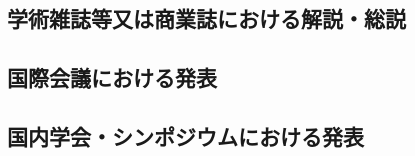 \documentclass[10pt,a4paper,twoside]{jarticle}
\newcommand{\研究課題名}{XMASS検出器を用いた季節変動による暗黒物質の直接探索}
\newcommand{\研究機関名}{神戸大学}
\newcommand{\申請者氏名}{岡直哉}
\newcommand{\研究代表者氏名}{\申請者氏名}
\newcommand{\研究期間の最終元号年度}{29}	%
\begin{document}
\subsection{学術雑誌等又は商業誌における解説・総説}
\newcommand{\学術雑誌等または商業誌における解説や総説}{　なし%
}

\subsection{国際会議における発表}
\newcommand{\国際会議における発表}{　なし%
}

\subsection{国内学会・シンポジウムにおける発表}
\newcommand{\国内学会やシンポジウムにおける発表}{%
	\begin{enumerate}
      		\item[] (日本語口頭発表・査読なし)
		\item \textcircled{}\ulinej{岡直哉} 他XMASS Collaboration、「XMASS実験：外部較正装置の改良」 日本物理学会 2013年秋季大会、高知大学、2013年9月20日
		\item \textcircled{}\ulinej{岡直哉} 他XMASS Collaboration、「XMASS実験：外部ガンマ線源によるXMASS検出器の較正」日本物理学会 第69回年次大会、東海大学、2014年3月30日
		\item[]他1件 %
      		\item[] (日本語ポスター発表・査読なし)
		\item \textcircled{}\ulinej{岡直哉} 「XMASS実験における検出器部材からのバックグラウンド事象の研究」原子核素粒子若手三者夏の学校、ホテルたつき、2013年8月5日
		\item[]他1件 %
      		\item[] (英語口頭発表・査読なし)
		\item \textcircled{}\ulinej{N. Oka}, ``Study of BG Contribution from Outer Components'', XMASS Collaboration Meeting, Kamioka Observatory, 2012年9月30日
		\item[]他9件
	\end{enumerate}
}
\end{document}
